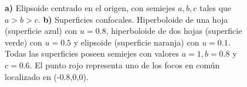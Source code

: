 \begin{figure}[H]
	\centering
	\caption{\textbf{a)} Elipsoide centrado en el origen, con semiejes $a, b, c$ tales que $a > b > c.$   \textbf{b)} Superficies confocales. Hiperboloide de una hoja (superficie azul) con $u=0.8$, hiperboloide de dos hojas (superficie verde) con $u=0.5$ y elipsoide (superficie naranja) con $u=0.1$. Todas las superficies poseen semiejes con valores $a=1, b=0.8$ y $c=0.6$. El punto rojo representa uno de los focos en común localizado en (-0.8,0,0).}
	\label{ConfocalQuadrics}
\end{figure}



